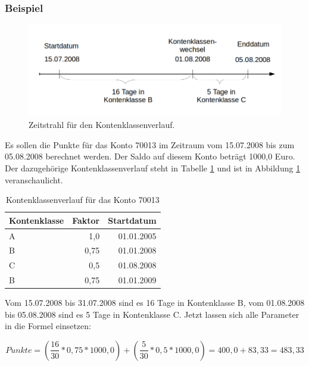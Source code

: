 \documentclass[12pt]{scrreprt}
\begin{document}
\subsubsection{Beispiel}

\begin{figure} 
  \includegraphics[width=\textwidth]{timeline.png}
  \caption{Zeitstrahl für den Kontenklassenverlauf.}
  \label{timeline}
\end{figure}

Es sollen die Punkte für das Konto 70013 im Zeitraum vom 15.07.2008 bis zum 05.08.2008 berechnet werden. Der Saldo auf diesem Konto beträgt 1000,0 Euro. Der dazugehörige Kontenklassenverlauf steht in Tabelle \ref{kklverlauf} und ist in Abbildung \ref{timeline} veranschaulicht.

\begin{table}
  \begin{center}
    \begin{tabular}{|l|r|r|}
      \hline
      \textbf{Kontenklasse} & \textbf{Faktor} & \textbf{Startdatum}\\
      \hline
      A & 1,0 & 01.01.2005\\
      \hline
      B & 0,75 & 01.01.2008\\
      \hline
      C & 0,5 & 01.08.2008\\
      \hline
      B & 0,75 & 01.01.2009\\
      \hline
    \end{tabular}
    \caption{Kontenklassenverlauf für das Konto 70013}
    \label{kklverlauf}
  \end{center}
\end{table}
\vspace{2mm}

Vom 15.07.2008 bis 31.07.2008 sind es 16 Tage in Kontenklasse B, vom 01.08.2008 bis 05.08.2008 sind es  5 Tage in Kontenklasse C. Jetzt lassen sich alle Parameter in die Formel einsetzen:

\begin{equation*}
  Punkte = \left(\frac{16}{30} * 0,75 * 1000,0\right) + \left(\frac{5}{30} * 0,5 * 1000,0\right) = 400,0 + 83,33 = 483,33
\end{equation*} \\
\end{document}
